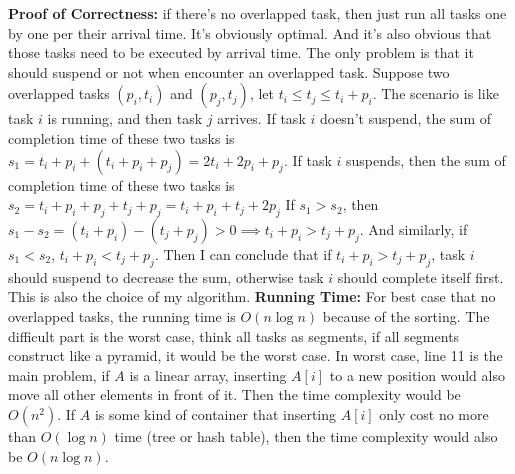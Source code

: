 \documentclass{article}       %
\begin{document}
\begin{enumerate}
	\textbf{Proof of Correctness:} if there's no overlapped task, then just run all tasks one by one per their arrival time. It's obviously optimal.\newline
	And it's also obvious that those tasks need to be executed by arrival time. The only problem is that it should suspend or not when encounter an overlapped task.\newline
	Suppose two overlapped tasks $(p_i, t_i)$ and $(p_j, t_j)$, let $t_i \leq t_j \leq t_i + p_i$.\newline
	The scenario is like task $i$ is running, and then task $j$ arrives.\newline
	If task $i$ doesn't suspend, the sum of completion time of these two tasks is $s_1 = t_i + p_i + (t_i + p_i + p_j) = 2t_i + 2p_i + p_j$.\newline
	If task $i$ suspends, then the sum of completion time of these two tasks is $s_2 = t_i + p_i + p_j + t_j + p_j = t_i + p_i + t_j + 2p_j$\newline
	If $s_1 > s_2$, then $s_1 - s_2 = (t_i + p_i) - (t_j + p_j) > 0 \implies t_i + p_i > t_j + p_j$. And similarly, if $s_1 < s_2$, $t_i + p_i < t_j + p_j$.\newline
	Then I can conclude that if $ t_i + p_i > t_j + p_j$, task $i$ should suspend to decrease the sum, otherwise task $i$ should complete itself first. This is also the choice of my algorithm.\newline\newline
	\textbf{Running Time:} For best case that no overlapped tasks, the running time is $O(n\log n)$ because of the sorting.\newline
	The difficult part is the worst case, think all tasks as segments, if all segments construct like a pyramid, it would be the worst case. In worst case, line 11 is the main problem, if $A$ is a linear array, inserting $A[i]$ to a new position would also move all other elements in front of it. Then the time complexity would be $O(n^2)$. If $A$ is some kind of container that inserting $A[i]$ only cost no more than $O(\log n)$ time (tree or hash table), then the time complexity would also be $O(n\log n)$.
	
\end{enumerate}
\end{document}
